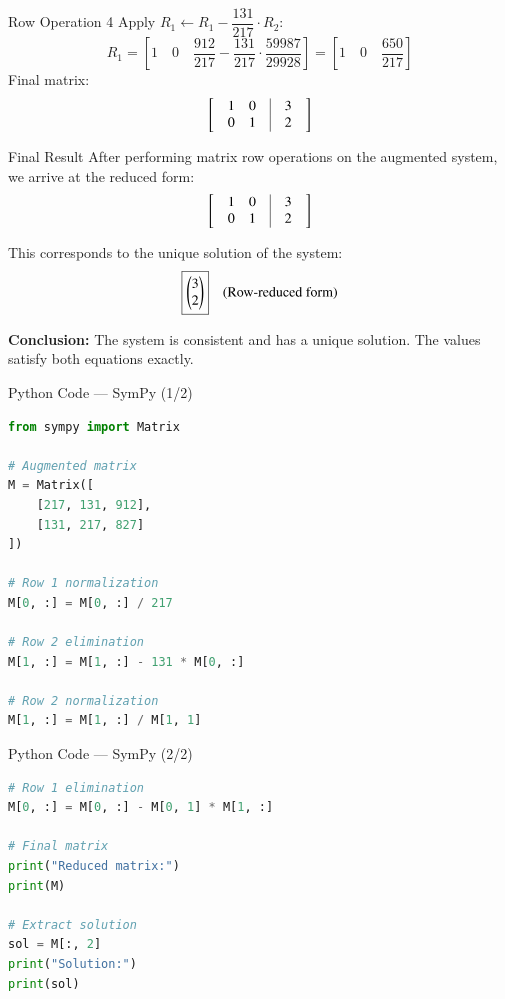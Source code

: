 \documentclass{beamer}
\begin{document}
\begin{frame}{Row Operation 4}
Apply \( R_1 \leftarrow R_1 - \dfrac{131}{217} \cdot R_2 \):
\[
R_1 =
\left[
1 \quad 0 \quad \dfrac{912}{217} - \dfrac{131}{217} \cdot \dfrac{59987}{29928}
\right]
=
\left[
1 \quad 0 \quad \dfrac{650}{217}
\right]
\]
Final matrix:
\[
\left[
\begin{array}{@{\hskip 10pt}c@{\hskip 10pt}c@{\hskip 10pt}|@{\hskip 10pt}c@{\hskip 10pt}}
1 & 0 & 3 \\
0 & 1 & 2
\end{array}
\right]
\]
\end{frame}

\begin{frame}{Final Result}
After performing matrix row operations on the augmented system, we arrive at the reduced form:
\vspace{0.3cm}
\[
\left[
\begin{array}{@{\hskip 10pt}c@{\hskip 10pt}c@{\hskip 10pt}|@{\hskip 10pt}c@{\hskip 10pt}}
1 & 0 & 3 \\
0 & 1 & 2
\end{array}
\right]
\]
\vspace{0.5cm}

This corresponds to the unique solution of the system:
\vspace{0.3cm}
\[
\boxed{
\begin{pmatrix}3 \\ 2\end{pmatrix}
}
\quad \text{(Row-reduced form)}
\]

\vspace{0.5cm}
\textbf{Conclusion:} The system is consistent and has a unique solution.  
The values satisfy both equations exactly.
\end{frame}

\begin{frame}[fragile]{Python Code — SymPy (1/2)}
\begin{lstlisting}[language=Python]
from sympy import Matrix

# Augmented matrix
M = Matrix([
    [217, 131, 912],
    [131, 217, 827]
])

# Row 1 normalization
M[0, :] = M[0, :] / 217

# Row 2 elimination
M[1, :] = M[1, :] - 131 * M[0, :]

# Row 2 normalization
M[1, :] = M[1, :] / M[1, 1]
\end{lstlisting}
\end{frame}

\begin{frame}[fragile]{Python Code — SymPy (2/2)}
\begin{lstlisting}[language=Python]
# Row 1 elimination
M[0, :] = M[0, :] - M[0, 1] * M[1, :]

# Final matrix
print("Reduced matrix:")
print(M)

# Extract solution
sol = M[:, 2]
print("Solution:")
print(sol)
\end{lstlisting}
\end{frame}
\end{document}
